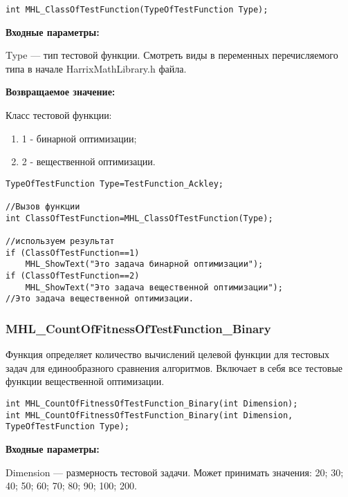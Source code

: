 \documentclass[a4paper,12pt]{article}
\begin{document}
\begin{lstlisting}[label=code_syntax_MHL_ClassOfTestFunction,caption=Синтаксис]
int MHL_ClassOfTestFunction(TypeOfTestFunction Type);
\end{lstlisting}

\textbf{Входные параметры:}

Type --- тип тестовой функции. Смотреть виды в переменных перечисляемого типа в начале HarrixMathLibrary.h файла.

\textbf{Возвращаемое значение:}

Класс тестовой функции:

\begin{enumerate}
\item 1 - бинарной оптимизации;
\item 2 - вещественной оптимизации.
\end{enumerate}


\begin{lstlisting}[label=code_use_MHL_ClassOfTestFunction,caption=Пример использования]
TypeOfTestFunction Type=TestFunction_Ackley;

//Вызов функции
int ClassOfTestFunction=MHL_ClassOfTestFunction(Type);

//используем результат
if (ClassOfTestFunction==1)
    MHL_ShowText("Это задача бинарной оптимизации");
if (ClassOfTestFunction==2)
    MHL_ShowText("Это задача вещественной оптимизации");
//Это задача вещественной оптимизации.
\end{lstlisting}

\subsubsection{MHL\_CountOfFitnessOfTestFunction\_Binary}\label{MHL_CountOfFitnessOfTestFunction_Binary}

Функция определяет количество вычислений целевой функции для тестовых задач для единообразного сравнения алгоритмов. Включает в себя все тестовые функции вещественной оптимизации.


\begin{lstlisting}[label=code_syntax_MHL_CountOfFitnessOfTestFunction_Binary,caption=Синтаксис]
int MHL_CountOfFitnessOfTestFunction_Binary(int Dimension);
int MHL_CountOfFitnessOfTestFunction_Binary(int Dimension, TypeOfTestFunction Type);
\end{lstlisting}

\textbf{Входные параметры:}

Dimension --- размерность тестовой задачи. Может принимать значения: 20; 30; 40; 50; 60; 70; 80; 90; 100; 200.
\end{document}

